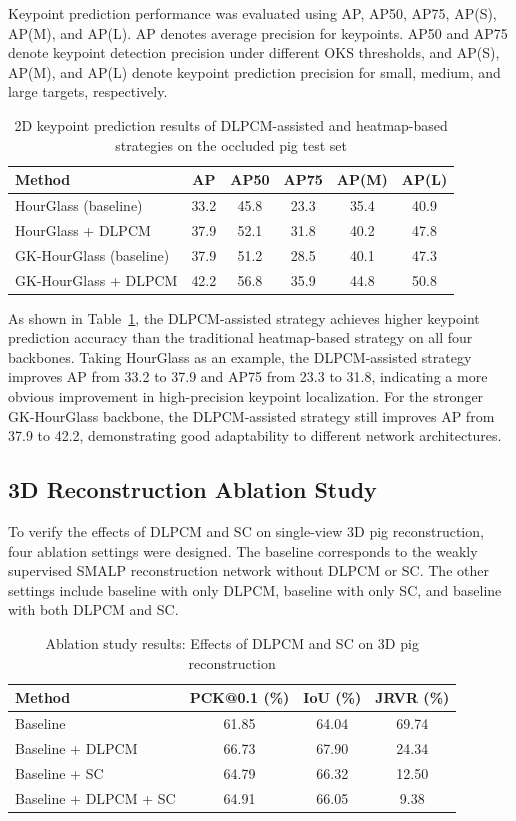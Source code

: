 \documentclass[runningheads]{llncs}
\begin{document}
Keypoint prediction performance was evaluated using AP, AP50, AP75, AP(S), AP(M), and AP(L). AP denotes average precision for keypoints. AP50 and AP75 denote keypoint detection precision under different OKS thresholds, and AP(S), AP(M), and AP(L) denote keypoint prediction precision for small, medium, and large targets, respectively.

\begin{table}
\centering
\caption{2D keypoint prediction results of DLPCM-assisted and heatmap-based strategies on the occluded pig test set}
\label{tab:2d_results}
\begin{tabular}{lccccc}
\toprule
Method & AP & AP50 & AP75 & AP(M) & AP(L) \\
\midrule
HourGlass (baseline) & 33.2 & 45.8 & 23.3 & 35.4 & 40.9 \\
HourGlass + DLPCM & 37.9 & 52.1 & 31.8 & 40.2 & 47.8 \\
GK-HourGlass (baseline) & 37.9 & 51.2 & 28.5 & 40.1 & 47.3 \\
GK-HourGlass + DLPCM & 42.2 & 56.8 & 35.9 & 44.8 & 50.8 \\
\bottomrule
\end{tabular}
\end{table}

As shown in Table~\ref{tab:2d_results}, the DLPCM-assisted strategy achieves higher keypoint prediction accuracy than the traditional heatmap-based strategy on all four backbones. Taking HourGlass as an example, the DLPCM-assisted strategy improves AP from 33.2 to 37.9 and AP75 from 23.3 to 31.8, indicating a more obvious improvement in high-precision keypoint localization. For the stronger GK-HourGlass backbone, the DLPCM-assisted strategy still improves AP from 37.9 to 42.2, demonstrating good adaptability to different network architectures.

\subsection{3D Reconstruction Ablation Study}
\label{subsec:3d_ablation}

To verify the effects of DLPCM and SC on single-view 3D pig reconstruction, four ablation settings were designed. The baseline corresponds to the weakly supervised SMALP reconstruction network without DLPCM or SC. The other settings include baseline with only DLPCM, baseline with only SC, and baseline with both DLPCM and SC.

\begin{table}
\centering
\caption{Ablation study results: Effects of DLPCM and SC on 3D pig reconstruction}
\label{tab:ablation}
\begin{tabular}{lccc}
\toprule
Method & PCK@0.1 (\%) & IoU (\%) & JRVR (\%) \\
\midrule
Baseline & 61.85 & 64.04 & 69.74 \\
Baseline + DLPCM & 66.73 & 67.90 & 24.34 \\
Baseline + SC & 64.79 & 66.32 & 12.50 \\
Baseline + DLPCM + SC & 64.91 & 66.05 & 9.38 \\
\bottomrule
\end{tabular}
\end{table}
\end{document}

